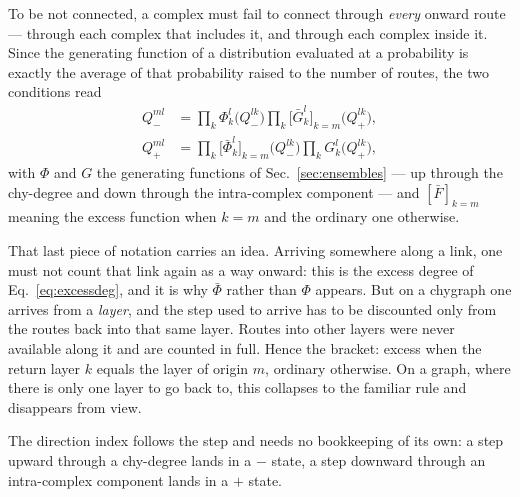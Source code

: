 To be not connected, a complex must fail to connect through \emph{every} onward
route --- through each complex that includes it, and through each complex inside
it. Since the generating function of a distribution evaluated at a probability
is exactly the average of that probability raised to the number of routes, the
two conditions read
\begin{align}
  Q^{ml}_{-}&=\prod_{k}\Phi^{l}_{k}\bigl(Q^{lk}_{-}\bigr)
              \prod_{k}\bigl[\bar G^{l}_{k}\bigr]_{k=m}\bigl(Q^{lk}_{+}\bigr),
  \label{eq:Qminus}\\
  Q^{ml}_{+}&=\prod_{k}\bigl[\bar\Phi^{l}_{k}\bigr]_{k=m}\bigl(Q^{lk}_{-}\bigr)
              \prod_{k}G^{l}_{k}\bigl(Q^{lk}_{+}\bigr),
  \label{eq:Qplus}
\end{align}
with $\Phi$ and $G$ the generating functions of Sec.~\ref{sec:ensembles} --- up
through the chy-degree and down through the intra-complex component --- and
$[\bar F]_{k=m}$ meaning the excess function when $k=m$ and the ordinary one
otherwise.

That last piece of notation carries an idea. Arriving
somewhere along a link, one must not count that link again as a way onward: this
is the excess degree of Eq.~\eqref{eq:excessdeg}, and it is why $\bar\Phi$
rather than $\Phi$ appears. But on a chygraph one arrives from a \emph{layer},
and the step used to arrive has to be discounted only from the routes back into
that same layer. Routes into other layers were never available along it and are
counted in full. Hence the bracket: excess when the return layer $k$ equals the
layer of origin $m$, ordinary otherwise. On a graph, where there is only one
layer to go back to, this collapses to the familiar rule and disappears from
view.

The direction index follows the step and needs no bookkeeping of its own: a step
upward through a chy-degree lands in a $-$ state, a step downward through an
intra-complex component lands in a $+$ state.

